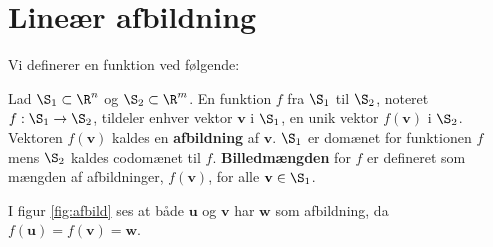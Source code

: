 \section{Lineær afbildning}
%
Vi definerer en funktion ved følgende:
%
\begin{defn}{}{}
Lad $\S _1 \subset \R^n$ og $\S _2 \subset \R^m$.
En funktion $f$ fra $\S_1$ til $\S_2$, noteret $f:\S_1\rightarrow\S_2$, tildeler enhver vektor $\textbf{v}$ i $\S_1$, en unik vektor $f(\textbf{v})$ i $\S_2$.
Vektoren $f(\textbf{v})$ kaldes en \textbf{afbildning} af $\textbf{v}$.
$\S_1$ er domænet for funktionen $f$ mens $\S_2$ kaldes codomænet til $f$.
\textbf{Billedmængden} for $f$ er defineret som mængden af afbildninger, $f(\textbf{v})$, for alle $\textbf{v}\in \S_1$.
\end{defn}
%
I figur \ref{fig:afbild} ses at både $\textbf{u}$ og $\textbf{v}$ har $\textbf{w}$ som afbildning, da $f(\textbf{u})=f(\textbf{v})=\textbf{w}$.

%
